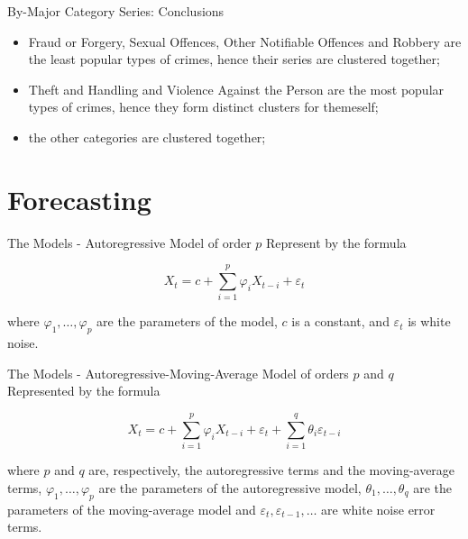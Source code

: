 \documentclass[12pt]{beamer}
\begin{document}
        \begin{frame}{By-Major Category Series: Conclusions}
            \begin{itemize}
                \item Fraud or Forgery, Sexual Offences, Other Notifiable Offences and Robbery are the least
                popular types of crimes, hence their series are clustered together;
                \item Theft and Handling and Violence Against the Person are the most popular types of
                crimes, hence they form distinct clusters for themeself;
                \item the other categories are clustered together;
            \end{itemize}
        \end{frame}

    \section{Forecasting} %
    \label{sec:forecasting}
        \begin{frame}{The Models - Autoregressive Model of order $p$}
            Represent by the formula

            \begin{equation*}
                X_t = c + \sum_{i = 1}^{p}\varphi_iX_{t - i} + \varepsilon_t
            \end{equation*}

            where $\varphi_{1}, \ldots , \varphi_{p}$ are the parameters of the model, $c$ is a constant,
            and $\varepsilon _{t}$ is white noise.
        \end{frame}

        \begin{frame}{The Models - Autoregressive-Moving-Average Model of orders $p$ and $q$}
            Represented by the formula

            \begin{equation*}
                X_t = c + \sum_{i = 1}^{p}\varphi_iX_{t - i} + \varepsilon_t + \sum_{i = 1}^{q}\theta_i
                \varepsilon_{t - i}
            \end{equation*}

            where $p$ and $q$ are, respectively, the autoregressive terms and the moving-average terms,
            $\varphi_{1}, \ldots , \varphi_{p}$ are the parameters of the autoregressive model,
            $\theta_1, \ldots, \theta_q$ are the parameters of the moving-average model and
            $\varepsilon_t, \varepsilon_{t - 1}, \ldots$ are white noise error terms.
        \end{frame}
\end{document}
